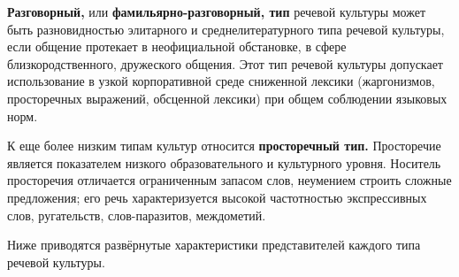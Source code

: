 \textbf{Разговорный,} или \textbf{фамильярно-разговорный, тип} речевой культуры может быть разновидностью элитарного и среднелитературного типа речевой культуры, если общение протекает в неофициальной обстановке, в сфере близкородственного, дружеского общения.
Этот тип речевой культуры допускает использование в узкой корпоративной среде сниженной лексики (жаргонизмов, просторечных выражений, обсценной лексики) при общем соблюдении языковых норм.

К еще более низким типам культур относится \textbf{просторечный тип.}
Просторечие является показателем низкого образовательного и культурного уровня.
Носитель просторечия отличается ограниченным запасом слов, неумением строить сложные предложения; его речь характеризуется высокой частотностью экспрессивных слов, ругательств, слов-паразитов, междометий.

Ниже приводятся развёрнутые характеристики представителей каждого типа речевой культуры.
